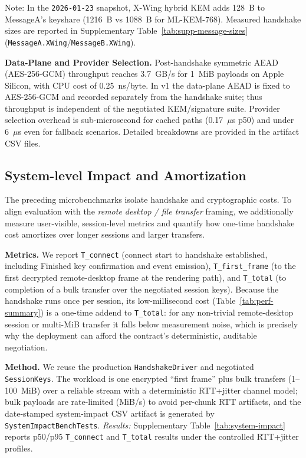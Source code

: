 \documentclass[10pt,journal,compsoc]{IEEEtran}
\begin{document}
Note: In the \texttt{2026-01-23} snapshot, X-Wing hybrid KEM adds
128~B to MessageA's keyshare (1216~B vs 1088~B for ML-KEM-768). Measured
handshake sizes are reported in Supplementary
Table~\ref{tab:supp-message-sizes}
(\texttt{MessageA.XWing}/\texttt{MessageB.XWing}).

\textbf{Data-Plane and Provider Selection.}
Post-handshake symmetric AEAD (AES-256-GCM) throughput reaches 3.7~GB/s for 1~MiB payloads on Apple Silicon, with CPU cost of 0.25~ns/byte. In v1 the data-plane AEAD is fixed to AES-256-GCM and recorded separately from the handshake suite; thus throughput is independent of the negotiated KEM/signature suite. Provider selection overhead is sub-microsecond for cached paths (0.17~$\mu$s p50) and under 6~$\mu$s even for fallback scenarios. Detailed breakdowns are provided in the artifact CSV files.

\subsection{System-level Impact and Amortization}\label{sec:system-impact}
The preceding microbenchmarks isolate handshake and cryptographic costs.
To align evaluation with the \emph{remote desktop / file transfer} framing,
we additionally measure user-visible, session-level metrics and quantify
how one-time handshake cost amortizes over longer sessions and larger
transfers.

\textbf{Metrics.} We report \texttt{T\_connect} (connect start to
handshake established, including Finished key confirmation and event
emission), \texttt{T\_first\_frame} (to the first decrypted
remote-desktop frame at the rendering path), and \texttt{T\_total} (to
completion of a bulk transfer over the negotiated session keys). Because
the handshake runs once per session, its low-millisecond cost
(Table~\ref{tab:perf-summary}) is a one-time addend to \texttt{T\_total}:
for any non-trivial remote-desktop session or multi-MiB transfer it falls
below measurement noise, which is precisely why the deployment can afford
the contract's deterministic, auditable negotiation.

\textbf{Method.} We reuse the production \texttt{HandshakeDriver} and
negotiated \texttt{SessionKeys}. The workload is one encrypted ``first
frame'' plus bulk transfers (1--100~MiB) over a reliable stream with a
deterministic RTT+jitter channel model; bulk payloads are rate-limited
(MiB/s) to avoid per-chunk RTT artifacts, and the date-stamped
system-impact CSV artifact is generated by
\texttt{SystemImpactBenchTests}.
\textit{Results:} Supplementary Table~\ref{tab:system-impact} reports p50/p95 \texttt{T\_connect} and \texttt{T\_total} results under the controlled RTT+jitter profiles.
\end{document}
